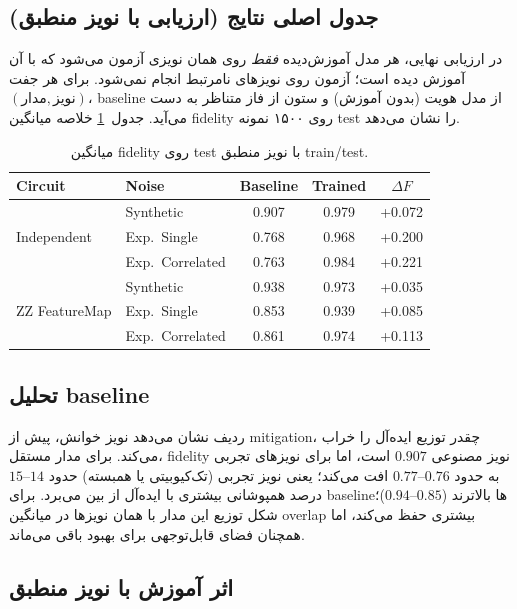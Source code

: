 \subsection*{جدول اصلی نتایج (ارزیابی با نویز منطبق)}

در ارزیابی نهایی، هر مدل آموزش‌دیده \emph{فقط} روی همان نویزی آزمون می‌شود که با آن آموزش دیده است؛ آزمون روی نویزهای نامرتبط انجام نمی‌شود. برای هر جفت $(\text{مدار}, \text{نویز})$، baseline از مدل هویت (بدون آموزش) و ستون  از فاز متناظر به دست می‌آید. جدول~\ref{tab:main-fidelity} خلاصه میانگین fidelity روی ۱۵۰۰ نمونه test را نشان می‌دهد.

\begin{table}[htbp]
\centering
\caption{میانگین fidelity روی test با نویز منطبق train/test.}
\label{tab:main-fidelity}
\begin{tabular}{llccc}
\toprule
Circuit & Noise & Baseline & Trained & $\Delta F$\\
\midrule
\multirow{3}{*}{Independent}
& Synthetic & 0.907 & 0.979 & +0.072\\
& Exp.\ Single & 0.768 & 0.968 & +0.200\\
& Exp.\ Correlated & 0.763 & 0.984 & +0.221\\
\midrule
\multirow{3}{*}{ZZ FeatureMap}
& Synthetic & 0.938 & 0.973 & +0.035\\
& Exp.\ Single & 0.853 & 0.939 & +0.085\\
& Exp.\ Correlated & 0.861 & 0.974 & +0.113\\
\bottomrule
\end{tabular}
\end{table}

\subsection*{تحلیل baseline}

ردیف  نشان می‌دهد نویز خوانش، پیش از mitigation، چقدر توزیع ایده‌آل را خراب می‌کند. برای مدار مستقل، fidelity نویز مصنوعی $0.907$ است، اما برای نویزهای تجربی به حدود $0.76$--$0.77$ افت می‌کند؛ یعنی نویز تجربی (تک‌کیوبیتی یا همبسته) حدود $14$--$15$ درصد همپوشانی بیشتری با ایده‌آل از بین می‌برد. برای  baselineها بالاترند ($0.85$--$0.94$)؛ شکل توزیع این مدار با همان نویزها در میانگین overlap بیشتری حفظ می‌کند، اما همچنان فضای قابل‌توجهی برای بهبود باقی می‌ماند.

\subsection*{اثر آموزش با نویز منطبق}

